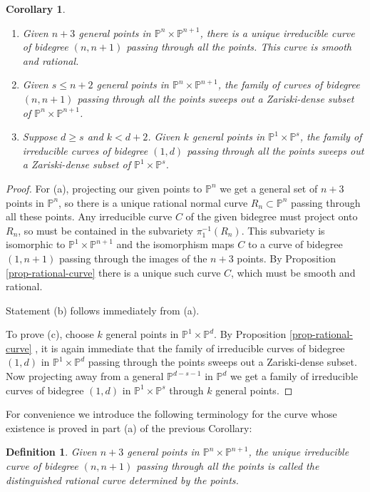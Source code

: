 \documentclass[a4paper,11pt]{article}
\newtheorem{corollary}[theorem]{Corollary}
\newtheorem{definition}[theorem]{Definition}
\newcommand{\PP}{\mathbb P}
\newcommand{\ourproduct}{\mathbb P^n \times \mathbb P^{n+1}}
\begin{document}
\begin{corollary} \label{corollary-ratcurvefewerpoints}
\begin{enumerate}
 \item[(a)] Given $n+3$ general points in $\ourproduct$, there is a unique irreducible curve of bidegree $(n,n+1)$ passing through all the points. This curve is smooth and rational.
 \item[(b)] Given $s \leq n+2$ general points in $\ourproduct$, the family of curves of bidegree $(n,n+1)$ passing through all the points sweeps out a Zariski-dense subset of $\ourproduct$.
 \item[(c)] Suppose $d \geq s$ and $k<d+2$. Given $k$ general points in $\PP^1 \times \PP^s$, the family of irreducible curves of bidegree $(1,d)$ passing through all the points sweeps out a Zariski-dense subset of $\PP^1 \times \PP^s$.
\end{enumerate}
\end{corollary}
\begin{proof}
For (a), projecting our given points to $\PP^n$ we get a general set of $n+3$ points in $\PP^n$, so there is a unique rational normal curve $R_n \subset \PP^n$ passing through all these points. Any irreducible curve $C$ of the given bidegree must project onto $R_n$, so must be contained in the subvariety $\pi_1^{-1}(R_n)$. This subvariety is isomorphic to $\PP^1 \times \PP^{n+1}$ and the isomorphism maps $C$ to a curve of bidegree $(1,n+1)$ passing through the images of the $n+3$ points. By Proposition \ref{prop-rational-curve} there is a unique such curve $C$, which must be smooth and rational.

Statement (b) follows immediately from (a).

To prove (c), choose $k$ general points in $\PP^1 \times \PP^d$. By Proposition \ref{prop-rational-curve} , it is again immediate that the family of irreducible curves of bidegree $(1,d)$ in $\PP^1 \times \PP^d$ passing through the points sweeps out a Zariski-dense subset. Now projecting away from a general $\PP^{d-s-1}$ in $\PP^d$ we get a family of irreducible curves of bidegree $(1,d)$ in $\PP^1 \times \PP^s$ through $k$ general points. 
\end{proof}
For convenience we introduce the following terminology for the curve whose existence is proved in part (a) of the previous Corollary: 
\begin{definition}\label{def-distinguishedcurve}
    Given $n+3$ general points in $\ourproduct$, the unique irreducible curve of bidegree $(n,n+1)$ passing through all the points is called the \emph{distinguished rational curve} determined by the points.
\end{definition}
\end{document}
